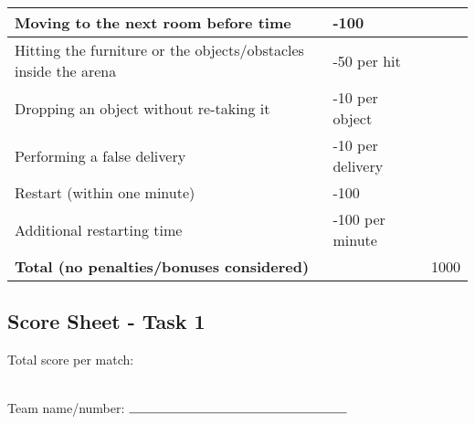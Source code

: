 \documentclass{article}
\begin{document}
\begin{center}
\begin{tabular}{ |m{8cm}|m{3cm}|m{1cm}| }
    \hline
    Moving to the next room before time & -100 & \\ 
    \hline
    Hitting the furniture or the objects/obstacles inside the arena & -50 per hit & \\ 
    \hline
    Dropping an object without re-taking it & -10 per object & \\ 
    \hline
    Performing a false delivery & -10 per delivery & \\ 
    \hline
    Restart (within one minute) & -100 & \\ 
    \hline
    Additional restarting time & -100 per minute & \\ 
    \hline
    \hline
    \textbf{Total (no penalties/bonuses considered)} & & 1000 \\ 
    \hline
\end{tabular}
\end{center}
\fi

\newpage
\subsection{Score Sheet - Task 1}

Total score per match:\\ \\

\begin{center} Team name/number: $\rule{6cm}{0.15mm}$ \end{center}
\end{document}
